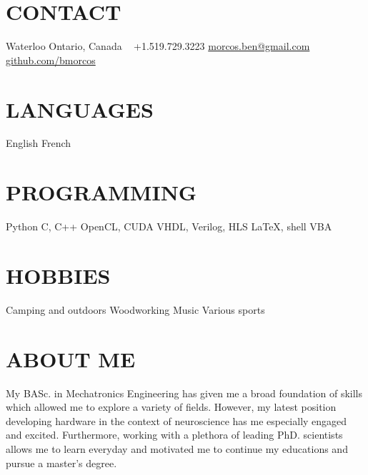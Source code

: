 \documentclass[a4paper,nocolors]{cv-friggeri-ben}
\begin{document}


\begin{aside} %
    \section{CONTACT}
    \hfill Waterloo
    \hfill Ontario, Canada
    ~
    \hfill +1.519.729.3223
    \hfill \href{mailto:morcos.ben@gmail.com}{morcos.ben@gmail.com}
    ~
    \hfill \href{https://github.com/bmorcos}{github.com/bmorcos}
    \section{LANGUAGES}
    English
    French
    \section{PROGRAMMING}
    Python
    C, C++
    OpenCL, CUDA
    VHDL, Verilog, HLS
    \LaTeX, shell
    VBA
    \section{HOBBIES}
    Camping and outdoors
    Woodworking
    Music
    Various sports
\end{aside}



\section{ABOUT ME}

\vspace{-5pt}
My BASc. in Mechatronics Engineering has given me a broad foundation of skills which allowed me to explore a variety of fields. However, my latest position developing hardware in the context of neuroscience has me especially engaged and excited. Furthermore, working with a plethora of leading PhD. scientists allows me to learn everyday and motivated me to continue my educations and pursue a master's degree.
\end{document}
